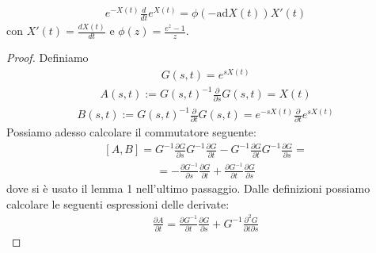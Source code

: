\begin{lemma} %
\begin{equation*}\begin{split}
e^{-X\left(t\right)}\frac{d}{dt}e^{X\left(t\right)}=\phi\left(-\textrm{ad}X\left(t\right)\right)X'\left(t\right)
\end{split}\end{equation*}
con $X'\left(t\right)=\frac{dX\left(t\right)}{dt}$ e $\phi\left(z\right)=\frac{e^z-1}{z}$.
\end{lemma}
\begin{proof} Definiamo
\begin{equation*}\begin{split}
G\left(s,t\right)=e^{sX\left(t\right)}
\end{split}\end{equation*}
\begin{equation*}\begin{split}
A\left(s,t\right):=G\left(s,t\right)^{-1}\frac{\partial }{\partial s}G\left(s,t\right)=X\left(t\right)
\end{split}\end{equation*}
\begin{equation*}\begin{split}
B\left(s,t\right):=G\left(s,t\right)^{-1}\frac{\partial }{\partial t}G\left(s,t\right)=e^{-sX\left(t\right)}\frac{\partial }{\partial t}e^{sX\left(t\right)}
\end{split}\end{equation*}
Possiamo adesso calcolare il commutatore seguente:
\begin{equation*}\begin{split}
\left[A,B\right]=G^{-1}\frac{\partial G}{\partial s}G^{-1}\frac{\partial G}{\partial t}-G^{-1}\frac{\partial G}{\partial t}G^{-1}\frac{\partial G}{\partial s}=
\end{split}\end{equation*}
\begin{equation*}\begin{split}
=-\frac{\partial G^{-1}}{\partial s}\frac{\partial G}{\partial t}+\frac{\partial G^{-1}}{\partial t}\frac{\partial G}{\partial s}
\end{split}\end{equation*}
dove si è usato il lemma 1 nell'ultimo passaggio. Dalle definizioni possiamo calcolare le seguenti espressioni delle derivate:
\begin{equation*}\begin{split}
\frac{\partial A}{\partial t}=\frac{\partial G^{-1}}{\partial t}\frac{\partial G}{\partial s}+G^{-1}\frac{\partial ^2G}{\partial t\partial s}

\end{split}
\end{equation*}
\end{proof}
